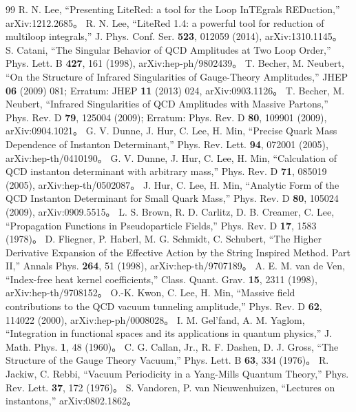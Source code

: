 \documentclass[a4paper,10pt]{ltjsarticle}
\begin{document}
\begin{thebibliography}{99}
 R. N. Lee, ``Presenting LiteRed: a tool for the Loop InTEgrals REDuction,'' arXiv:1212.2685。
 R. N. Lee, ``LiteRed 1.4: a powerful tool for reduction of multiloop integrals,'' J. Phys. Conf. Ser. \textbf{523}, 012059 (2014), arXiv:1310.1145。
 S. Catani, ``The Singular Behavior of QCD Amplitudes at Two Loop Order,'' Phys. Lett. B \textbf{427}, 161 (1998), arXiv:hep-ph/9802439。
 T. Becher, M. Neubert, ``On the Structure of Infrared Singularities of Gauge-Theory Amplitudes,'' JHEP \textbf{06} (2009) 081; Erratum: JHEP \textbf{11} (2013) 024, arXiv:0903.1126。
 T. Becher, M. Neubert, ``Infrared Singularities of QCD Amplitudes with Massive Partons,'' Phys. Rev. D \textbf{79}, 125004 (2009); Erratum: Phys. Rev. D \textbf{80}, 109901 (2009), arXiv:0904.1021。
 G. V. Dunne, J. Hur, C. Lee, H. Min, ``Precise Quark Mass Dependence of Instanton Determinant,'' Phys. Rev. Lett. \textbf{94}, 072001 (2005), arXiv:hep-th/0410190。
 G. V. Dunne, J. Hur, C. Lee, H. Min, ``Calculation of QCD instanton determinant with arbitrary mass,'' Phys. Rev. D \textbf{71}, 085019 (2005), arXiv:hep-th/0502087。
 J. Hur, C. Lee, H. Min, ``Analytic Form of the QCD Instanton Determinant for Small Quark Mass,'' Phys. Rev. D \textbf{80}, 105024 (2009), arXiv:0909.5515。
 L. S. Brown, R. D. Carlitz, D. B. Creamer, C. Lee, ``Propagation Functions in Pseudoparticle Fields,'' Phys. Rev. D \textbf{17}, 1583 (1978)。
 D. Fliegner, P. Haberl, M. G. Schmidt, C. Schubert, ``The Higher Derivative Expansion of the Effective Action by the String Inspired Method. Part II,'' Annals Phys. \textbf{264}, 51 (1998), arXiv:hep-th/9707189。
 A. E. M. van de Ven, ``Index-free heat kernel coefficients,'' Class. Quant. Grav. \textbf{15}, 2311 (1998), arXiv:hep-th/9708152。
 O.-K. Kwon, C. Lee, H. Min, ``Massive field contributions to the QCD vacuum tunneling amplitude,'' Phys. Rev. D \textbf{62}, 114022 (2000), arXiv:hep-ph/0008028。
 I. M. Gel'fand, A. M. Yaglom, ``Integration in functional spaces and its applications in quantum physics,'' J. Math. Phys. \textbf{1}, 48 (1960)。
 C. G. Callan, Jr., R. F. Dashen, D. J. Gross, ``The Structure of the Gauge Theory Vacuum,'' Phys. Lett. B \textbf{63}, 334 (1976)。
 R. Jackiw, C. Rebbi, ``Vacuum Periodicity in a Yang-Mills Quantum Theory,'' Phys. Rev. Lett. \textbf{37}, 172 (1976)。
 S. Vandoren, P. van Nieuwenhuizen, ``Lectures on instantons,'' arXiv:0802.1862。

\end{thebibliography}
\end{document}
